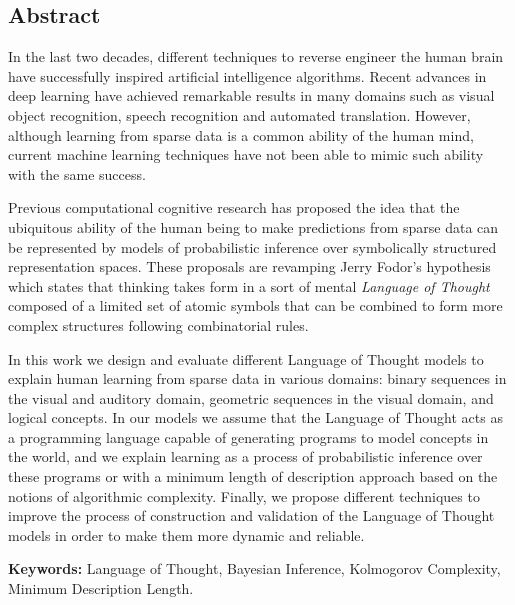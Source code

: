
\rhead{}
\lhead{}
\renewcommand{\headrulewidth}{0pt}
\begin{center}
    \section*{Abstract}
\end{center}

In the last two decades, different techniques to reverse engineer the human brain have successfully inspired artificial intelligence algorithms. Recent advances in deep learning have achieved remarkable results in many domains such as visual object recognition, speech recognition and automated translation. However, although learning from sparse data is a common ability of the human mind, current machine learning techniques have not been able to mimic such ability with the same success.

\medskip

Previous computational cognitive research has proposed the idea that the ubiquitous ability of the human being to make predictions from sparse data can be represented by models of probabilistic inference over symbolically structured representation spaces. These proposals are revamping Jerry Fodor's hypothesis which states that thinking takes form in a sort of mental {\em Language of Thought} composed of a limited set of atomic symbols that can be combined to form more complex structures following combinatorial rules.

\medskip

In this work we design and evaluate different Language of Thought models to explain human learning from sparse data in various domains: binary sequences in the visual and auditory domain, geometric sequences in the visual domain, and logical concepts. In our models we assume that the Language of Thought acts as a programming language capable of generating programs to model concepts in the world, and we explain learning as a process of probabilistic inference over these programs or with a minimum length of description approach based on the notions of algorithmic complexity. Finally, we propose different techniques to improve the process of construction and validation of the Language of Thought models in order to make them more dynamic and reliable.
\vfill

\noindent\textbf{Keywords:} Language of Thought, Bayesian Inference, Kolmogorov Complexity, Minimum Description Length.

\newpage

